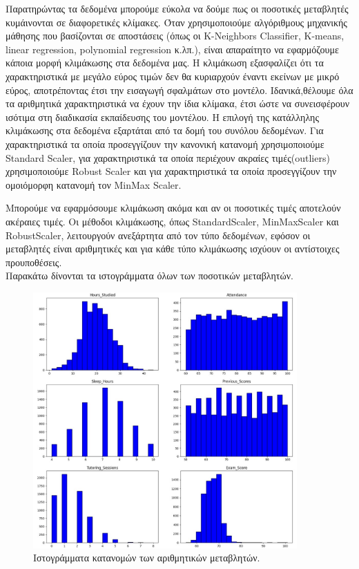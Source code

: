 \documentclass[12pt]{article}
\begin{document}
Παρατηρώντας τα δεδομένα μπορούμε εύκολα να δούμε πως οι ποσοτικές μεταβλητές κυμάινονται σε διαφορετικές κλίμακες. 
Όταν χρησιμοποιούμε αλγόριθμους μηχανικής μάθησης που βασίζονται σε αποστάσεις (όπως οι K-Neighbors Classifier, K-means, linear regression, polynomial regression κ.λπ.), είναι απαραίτητο να εφαρμόζουμε κάποια μορφή κλιμάκωσης στα δεδομένα μας. Η κλιμάκωση εξασφαλίζει ότι τα χαρακτηριστικά με μεγάλο εύρος τιμών δεν θα κυριαρχούν έναντι εκείνων με μικρό εύρος, αποτρέποντας έτσι την εισαγωγή σφαλμάτων στο μοντέλο. Ιδανικά,θέλουμε όλα τα αριθμητικά χαρακτηριστικά να έχουν την ίδια κλίμακα, έτσι ώστε να συνεισφέρουν ισότιμα στη διαδικασία εκπαίδευσης του μοντέλου. Η επιλογή της κατάλληλης κλιμάκωσης στα δεδομένα εξαρτάται από τα δομή του συνόλου δεδομένων. Για χαρακτηριστικά τα οποία προσεγγίζουν την κανονική κατανομή χρησιμοποιούμε Standard Scaler, για χαρακτηριστικά τα οποία περιέχουν ακραίες τιμές(outliers) χρησιμοποιούμε Robust Scaler και για χαρακτηριστικά τα οποία προσεγγίζουν την ομοιόμορφη κατανομή τον MinMax Scaler.

Mπορούμε να εφαρμόσουμε κλιμάκωση ακόμα και αν οι ποσοτικές τιμές αποτελούν ακέραιες τιμές. Οι μέθοδοι κλιμάκωσης, όπως StandardScaler, MinMaxScaler και RobustScaler, λειτουργούν ανεξάρτητα από τον τύπο δεδομένων, εφόσον οι μεταβλητές είναι αριθμητικές και για κάθε τύπο κλιμάκωσης ισχύουν οι αντίστοιχες προυποθέσεις.  
\\

\noindent Παρακάτω δίνονται τα ιστογράμματα όλων των ποσοτικών μεταβλητών.

\begin{figure}
    \centering 
    \includegraphics[width=0.9\textwidth]{./images/icon2.jpg}
    \caption{Ιστογράμματα κατανομών των αριθμητικών μεταβλητών.}
    \label{fig:histograms}        
\end{figure}
\end{document}
